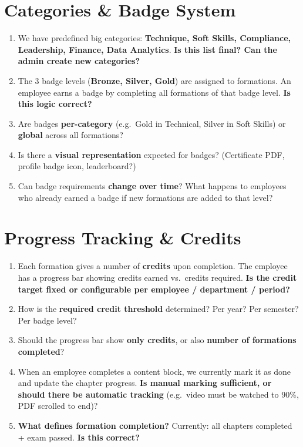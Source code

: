 \documentclass[11pt,a4paper]{article}
\begin{document}
\section{Categories \& Badge System}

\begin{enumerate}[leftmargin=2em]
  \item We have predefined big categories: \textbf{Technique, Soft Skills, Compliance, Leadership, Finance, Data Analytics}. \textbf{Is this list final? Can the admin create new categories?}
  \item The 3 badge levels (\textbf{Bronze, Silver, Gold}) are assigned to formations. An employee earns a badge by completing all formations of that badge level. \textbf{Is this logic correct?}
  \item Are badges \textbf{per-category} (e.g.\ Gold in Technical, Silver in Soft Skills) or \textbf{global} across all formations?
  \item Is there a \textbf{visual representation} expected for badges? (Certificate PDF, profile badge icon, leaderboard?)
  \item Can badge requirements \textbf{change over time}? What happens to employees who already earned a badge if new formations are added to that level?
\end{enumerate}

\section{Progress Tracking \& Credits}

\begin{enumerate}[leftmargin=2em]
  \item Each formation gives a number of \textbf{credits} upon completion. The employee has a progress bar showing credits earned vs.\ credits required. \textbf{Is the credit target fixed or configurable per employee / department / period?}
  \item How is the \textbf{required credit threshold} determined? Per year? Per semester? Per badge level?
  \item Should the progress bar show \textbf{only credits}, or also \textbf{number of formations completed}?
  \item When an employee completes a content block, we currently mark it as done and update the chapter progress. \textbf{Is manual marking sufficient, or should there be automatic tracking} (e.g.\ video must be watched to 90\%, PDF scrolled to end)?
  \item \textbf{What defines formation completion?} Currently: all chapters completed + exam passed. \textbf{Is this correct?}
\end{enumerate}
\end{document}
